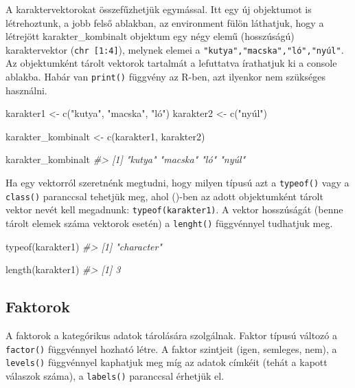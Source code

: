 \documentclass[
]{book}
\newenvironment{Shaded}{\begin{snugshade}}{\end{snugshade}}
\newcommand{\CommentTok}[1]{\textcolor[rgb]{0.56,0.35,0.01}{\textit{#1}}}
\newcommand{\FunctionTok}[1]{\textcolor[rgb]{0.00,0.00,0.00}{#1}}
\newcommand{\NormalTok}[1]{#1}
\newcommand{\OtherTok}[1]{\textcolor[rgb]{0.56,0.35,0.01}{#1}}
\newcommand{\StringTok}[1]{\textcolor[rgb]{0.31,0.60,0.02}{#1}}
\begin{document}
A karaktervektorokat összefűzhetjük egymással. Itt egy új objektumot is
létrehoztunk, a jobb felső ablakban, az environment fülön láthatjuk,
hogy a létrejött karakter\_kombinalt objektum egy négy elemű
(hosszúságú) karaktervektor (\texttt{chr\ {[}1:4{]}}), melynek elemei a
\texttt{"kutya","macska","ló","nyúl"}. Az objektumként tárolt vektorok
tartalmát a lefuttatva írathatjuk ki a console ablakba. Habár van
\texttt{print()} függvény az R-ben, azt ilyenkor nem szükséges
használni.

\begin{Shaded}
\begin{Highlighting}[]
\NormalTok{karakter1 }\OtherTok{\textless{}{-}} \FunctionTok{c}\NormalTok{(}\StringTok{"kutya"}\NormalTok{, }\StringTok{"macska"}\NormalTok{, }\StringTok{"ló"}\NormalTok{)}
\NormalTok{karakter2 }\OtherTok{\textless{}{-}} \FunctionTok{c}\NormalTok{(}\StringTok{"nyúl"}\NormalTok{)}

\NormalTok{karakter\_kombinalt }\OtherTok{\textless{}{-}} \FunctionTok{c}\NormalTok{(karakter1, karakter2)}

\NormalTok{karakter\_kombinalt}
\CommentTok{\#\textgreater{} [1] "kutya"  "macska" "ló"     "nyúl"}
\end{Highlighting}
\end{Shaded}

Ha egy vektorról szeretnénk megtudni, hogy milyen típusú azt a
\texttt{typeof()} vagy a \texttt{class()} paranccsal tehetjük meg, ahol
()-ben az adott objektumként tárolt vektor nevét kell megadnunk:
\texttt{typeof(karakter1)}. A vektor hosszúságát (benne tárolt elemek
száma vektorok esetén) a \texttt{lenght()} függvénnyel tudhatjuk meg.

\begin{Shaded}
\begin{Highlighting}[]
\FunctionTok{typeof}\NormalTok{(karakter1)}
\CommentTok{\#\textgreater{} [1] "character"}

\FunctionTok{length}\NormalTok{(karakter1)}
\CommentTok{\#\textgreater{} [1] 3}
\end{Highlighting}
\end{Shaded}

\hypertarget{faktorok}{%
\subsection{Faktorok}\label{faktorok}}

A faktorok a kategórikus adatok tárolására szolgálnak. Faktor típusú
változó a \texttt{factor()} függvénnyel hozható létre. A faktor
szintjeit (igen, semleges, nem), a \texttt{levels()} függvénnyel
kaphatjuk meg míg az adatok címkéit (tehát a kapott válaszok száma), a
\texttt{labels()} paranccsal érhetjük el.
\end{document}
